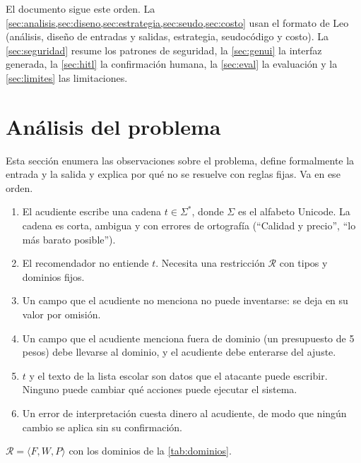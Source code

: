 \documentclass[11pt,letterpaper]{article}
\newcommand{\R}{\mathcal{R}}
\begin{document}
El documento sigue este orden. La \cref{sec:analisis,sec:diseno,sec:estrategia,sec:seudo,sec:costo} usan el formato
de Leo (an\'alisis, dise\~no de entradas y salidas, estrategia, seudoc\'odigo y costo). La
\cref{sec:seguridad} resume los patrones de seguridad, la \cref{sec:genui} la interfaz generada, la
\cref{sec:hitl} la confirmaci\'on humana, la \cref{sec:eval} la evaluaci\'on y la \cref{sec:limites} las
limitaciones.

\section{An\'alisis del problema}\label{sec:analisis}

Esta secci\'on enumera las observaciones sobre el problema, define formalmente la entrada y la salida y
explica por qu\'e no se resuelve con reglas fijas. Va en ese orden.

\begin{enumerate}[label=\textbf{O\arabic*.},leftmargin=*]
  \item El acudiente escribe una cadena $t\in\Sigma^{*}$, donde $\Sigma$ es el alfabeto Unicode. La
  cadena es corta, ambigua y con errores de ortograf\'ia (\enquote{Calidad y precio}, \enquote{lo m\'as barato posible}).
  \item El recomendador no entiende $t$. Necesita una restricci\'on $\R$ con tipos y dominios fijos.
  \item Un campo que el acudiente no menciona no puede inventarse: se deja en su valor por omisi\'on.
  \item Un campo que el acudiente menciona fuera de dominio (un presupuesto de 5 pesos) debe llevarse al
  dominio, y el acudiente debe enterarse del ajuste.
  \item $t$ y el texto de la lista escolar son datos que el atacante puede escribir. Ninguno puede cambiar
  qu\'e acciones puede ejecutar el sistema.
  \item Un error de interpretaci\'on cuesta dinero al acudiente, de modo que ning\'un cambio se aplica sin
  su confirmaci\'on.
\end{enumerate}

\begin{definicion}[Restricci\'on $\R$]\label{def:R}
$\R=\langle F,W,P\rangle$ con los dominios de la \cref{tab:dominios}.
\end{definicion}
\end{document}
